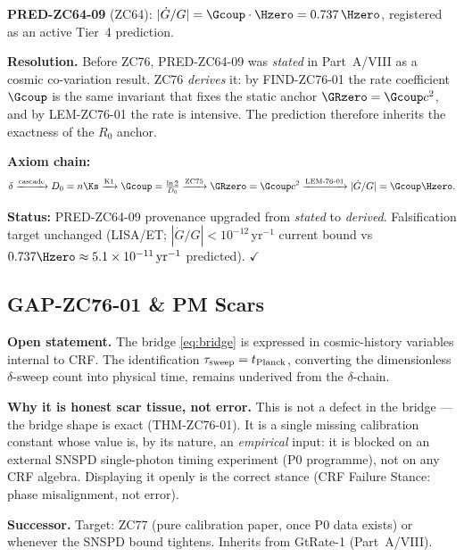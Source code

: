 \documentclass[12pt, a4paper]{article}
\begin{document}
\begin{formalbox}[title={COR-ZC76-01: PRED-ZC64-09 Derived from the
  $R_0$ Anchor}]

\textbf{PRED-ZC64-09} (ZC64): $|\dot{G}/G| = \Gcoup\cdot\Hzero =
0.737\,\Hzero$, registered as an active Tier~4 prediction.

\textbf{Resolution.}
Before ZC76, PRED-ZC64-09 was \emph{stated} in Part~A/VIII as a cosmic
co-variation result. ZC76 \emph{derives} it: by FIND-ZC76-01 the rate
coefficient $\Gcoup$ is the same invariant that fixes the static anchor
$\GRzero = \Gcoup c^2$, and by LEM-ZC76-01 the rate is intensive. The
prediction therefore inherits the exactness of the $R_0$ anchor.

\textbf{Axiom chain:}
\[
  \delta \xrightarrow{\text{cascade}} D_0=n\Ks
  \xrightarrow{\text{K1}} \Gcoup=\tfrac{\ln2}{D_0}
  \xrightarrow{\text{ZC75}} \GRzero=\Gcoup c^2
  \xrightarrow{\text{LEM-76-01}} |\dot{G}/G|=\Gcoup\Hzero .
\]

\textbf{Status:} PRED-ZC64-09 provenance upgraded from
\emph{stated} to \emph{derived}. Falsification target unchanged
(LISA/ET; $|\dot{G}/G|<10^{-12}\,\mathrm{yr}^{-1}$ current bound vs
$0.737\Hzero\approx 5.1\times10^{-11}\,\mathrm{yr}^{-1}$ predicted).
$\checkmark$
\end{formalbox}

\subsection{GAP-ZC76-01 \& PM Scars}
\label{sec:gaps}


\begin{openqbox}[title={GAP-ZC76-01: The Sweep-to-Time Calibration
  (GtRate-1)}]
\textbf{Open statement.}
The bridge \eqref{eq:bridge} is expressed in cosmic-history variables
internal to CRF. The identification $\tau_{\rm sweep} = t_{\rm Planck}$,
converting the dimensionless $\delta$-sweep count into physical time,
remains underived from the $\delta$-chain.

\textbf{Why it is honest scar tissue, not error.}
This is not a defect in the bridge --- the bridge shape is exact
(THM-ZC76-01). It is a single missing calibration constant whose value
is, by its nature, an \emph{empirical} input: it is blocked on an
external SNSPD single-photon timing experiment (P0 programme), not on
any CRF algebra. Displaying it openly is the correct stance
(CRF Failure Stance: phase misalignment, not error).

\textbf{Successor.}
Target: ZC77 (pure calibration paper, once P0 data exists) or whenever
the SNSPD bound tightens. Inherits from GtRate-1 (Part~A/VIII).
\end{openqbox}
\end{document}
